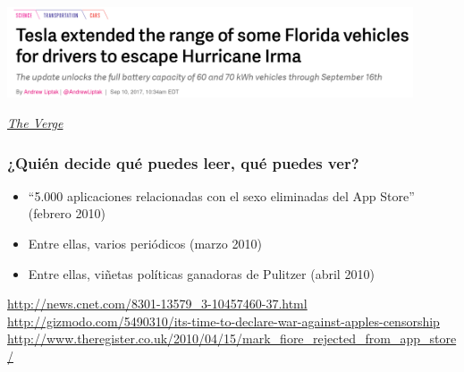 \documentclass[17pt,aspectratio=169,hyperref=pdfusetitle]{beamer}
\begin{document}
\begin{frame}[fragile]

  \begin{center}
  \includegraphics[width=12cm]{figs/tesla}
  \end{center}

  \begin{flushright}
    {\em
      \href{https://www.theverge.com/2017/9/10/16283330/tesla-hurricane-irma-update-florida-extend-range-model-s-x-60-60d}{The Verge} \\
      }
  \end{flushright}
  
\end{frame}


\begin{frame}
\frametitle{¿Quién decide qué puedes leer, qué puedes ver?}

\begin{itemize}
\item``5.000 aplicaciones relacionadas con el sexo eliminadas del App Store''  (febrero 2010)
  
\item Entre ellas, varios periódicos (marzo 2010)\\

\item Entre ellas, viñetas políticas ganadoras de Pulitzer (abril 2010)\\
\end{itemize}

  \begin{flushright}
    {\tiny
      \url{http://news.cnet.com/8301-13579_3-10457460-37.html}\\
      \url{http://gizmodo.com/5490310/its-time-to-declare-war-against-apples-censorship}\\
      \url{http://www.theregister.co.uk/2010/04/15/mark_fiore_rejected_from_app_store/}\\
    }
  \end{flushright}

\end{frame}
\end{document}
